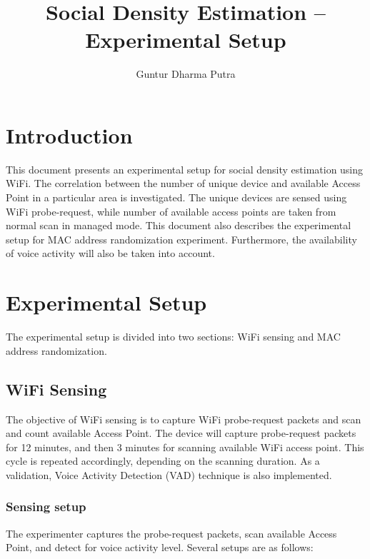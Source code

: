 \documentclass{article}
\begin{document}
\title{Social Density Estimation -- Experimental Setup}
\author{Guntur Dharma Putra}

\maketitle



\section{Introduction} %
\label{sec:introduction}
This document presents an experimental setup for social density estimation using WiFi. The correlation between the number of unique device and available Access Point in a particular area is investigated. The unique devices are sensed using WiFi probe-request, while number of available access points are taken from normal scan in managed mode. This document also describes the experimental setup for MAC address randomization experiment. Furthermore, the availability of voice activity will also be taken into account.

\section{Experimental Setup} %
\label{sec:experimental_setup}
The experimental setup is divided into two sections: WiFi sensing and MAC address randomization.

\subsection{WiFi Sensing} %
\label{sub:wifi_sensing}
The objective of WiFi sensing is to capture WiFi probe-request packets and scan and count available Access Point. The device will capture probe-request packets for 12 minutes, and then 3 minutes for scanning available WiFi access point. This cycle is repeated accordingly, depending on the scanning duration. As a validation, Voice Activity Detection (VAD) technique is also implemented.

\subsubsection*{Sensing setup} %
The experimenter captures the probe-request packets, scan available Access Point, and detect for voice activity level. Several setups are as follows:
\end{document}
